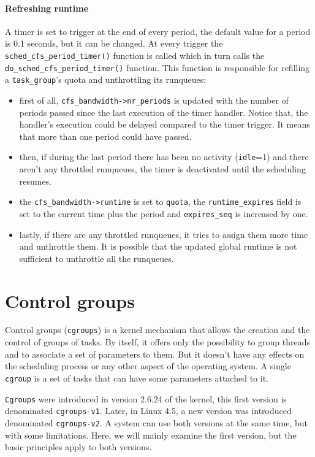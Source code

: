 \paragraph{Refreshing runtime}
A timer is set to trigger at the end of every period, the default value for a period is 0.1 seconds, but it can be changed. At every trigger the \verb|sched_cfs_period_timer()| function is called which in turn calls the \verb|do_sched_cfs_period_timer()| function. This function is responsible for refilling a \verb|task_group|'s quota and unthrottling its runqueues:
\begin{itemize}
    \item first of all, \verb|cfs_bandwidth->nr_periods| is updated with the number of periods passed since the last execution of the timer handler. Notice that, the handler's execution could be delayed compared to the timer trigger. It means that more than one period could have passed.
    \item then, if during the last period there has been no activity (\verb|idle|=1) and there aren't any throttled runqueues, the timer is deactivated until the scheduling resumes. %
    \item the \verb|cfs_bandwidth->runtime| is set to \verb|quota|, the \verb|runtime_expires| field is set to the current time plus the period and \verb|expires_seq| is increased by one.
    \item lastly, if there are any throttled runqueues, it tries to assign them more time and unthrottle them. It is possible that the updated global runtime is not sufficient to unthrottle all the runqueues.
\end{itemize}

\section{Control groups}
\label{sec:cgroup}

Control groups (\verb|cgroups|) is a kernel mechanism that allows the creation and the control of groups of tasks. By itself, it offers only the possibility to group threads and to associate a set of parameters to them. But it doesn't have any effects on the scheduling process or any other aspect of the operating system. A single \verb|cgroup| is a set of tasks that can have some parameters attached to it. 

\verb|Cgroups| were introduced in version 2.6.24 of the kernel, this first version is denominated \verb|cgroups-v1|. Later, in Linux 4.5, a new version was introduced denominated \verb|cgroups-v2|. A system can use both versions at the same time, but with some limitations. Here, we will mainly examine the first version, but the basic principles apply to both versions.

